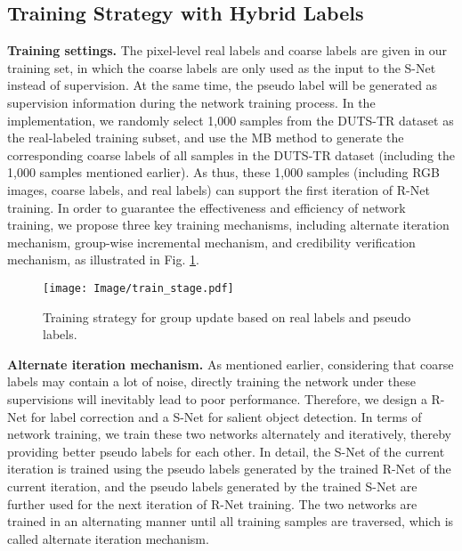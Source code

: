 \documentclass[journal]{IEEEtran}
\begin{document}
\subsection{Training Strategy with Hybrid Labels}\label{training}

\textbf{Training settings.} The pixel-level real labels and coarse labels are given in our training set, in which the coarse labels are only used as the input to the S-Net instead of supervision.
At the same time, the pseudo label will be generated as supervision information during the network training process.
In the implementation, we randomly select 1,000 samples from the DUTS-TR dataset \cite{wang2017learning} as the real-labeled training subset, and use the MB method \cite{zhang2015minimum} to generate the corresponding coarse labels of all samples in the DUTS-TR dataset (including the 1,000 samples mentioned earlier).
As thus, these 1,000 samples (including RGB images, coarse labels, and real labels) can support the first iteration of R-Net training.
In order to guarantee the effectiveness and efficiency of network training, we propose three key training mechanisms, including alternate iteration mechanism, group-wise incremental mechanism, and credibility verification mechanism, as illustrated in Fig. \ref{fig:my_label}.


\begin{figure}[!t]
    \centering
    \texttt{[image: Image/train\_stage.pdf]}
    \caption{Training strategy for group update based on real labels and pseudo labels.}
    \label{fig:my_label}
\end{figure}
\textbf{Alternate iteration mechanism.}
As mentioned earlier, considering that coarse labels may contain a lot of noise, directly training the network under these supervisions will inevitably lead to poor performance.
Therefore, we design a R-Net for label correction and a S-Net for salient object detection.
In terms of network training, we train these two networks alternately and iteratively, thereby providing better pseudo labels for each other.
In detail, the S-Net of the current iteration is trained using the pseudo labels generated by the trained R-Net of the current iteration, and the pseudo labels generated by the trained S-Net are further used for the next iteration of R-Net training.
The two networks are trained in an alternating manner until all training samples are traversed, which is called alternate iteration mechanism.
\end{document}
